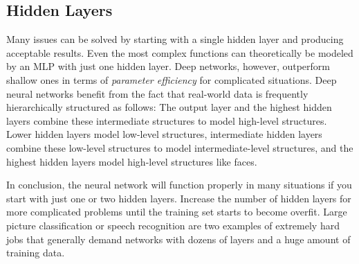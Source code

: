 \subsection{Hidden Layers}
Many issues can be solved by starting with a single hidden layer and producing acceptable results. Even the most complex functions can theoretically be modeled by an MLP with just one hidden layer. Deep networks, however, outperform shallow ones in terms of \textit{parameter efficiency} for complicated situations. Deep neural networks benefit from the fact that real-world data is frequently hierarchically structured as follows: The output layer and the highest hidden layers combine these intermediate structures to model high-level structures. Lower hidden layers model low-level structures, intermediate hidden layers combine these low-level structures to model intermediate-level structures, and the highest hidden layers model high-level structures like faces.

In conclusion, the neural network will function properly in many situations if you start with just one or two hidden layers. Increase the number of hidden layers for more complicated problems until the training set starts to become overfit. Large picture classification or speech recognition are two examples of extremely hard jobs that generally demand networks with dozens of layers and a huge amount of training data.